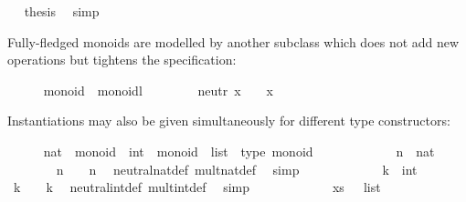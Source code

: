 \begin{isabellebody}
\ \isamarkupfalse%
\ {\isacharquery}thesis\ \isamarkupfalse%
\ simp\isanewline
\ \ \ \ \ \ \isamarkupfalse%
\isanewline
\ \ \ \ \isamarkupfalse%
%
\endisatagproof
{\isafoldproof}%
%
\isadelimproof
%
\endisadelimproof
%
\begin{isamarkuptext}%
\noindent Fully-fledged monoids are modelled by another subclass
  which does not add new operations but tightens the specification:%
\end{isamarkuptext}%
\isamarkuptrue%
\ \ \ \ \isamarkupfalse%
\ monoid\ {\isacharequal}\ monoidl\ {\isacharplus}\isanewline
\ \ \ \ \ \ \ neutr{\isacharcolon}\ {\isachardoublequoteopen}x\ \isactrlloc {\isasymotimes}\ \isactrlloc {\isasymone}\ {\isacharequal}\ x{\isachardoublequoteclose}%
\begin{isamarkuptext}%
\noindent Instantiations may also be given simultaneously for different
  type constructors:%
\end{isamarkuptext}%
\isamarkuptrue%
\ \ \ \ \isamarkupfalse%
\ nat\ {\isacharcolon}{\isacharcolon}\ monoid\ \ int\ {\isacharcolon}{\isacharcolon}\ monoid\ \ list\ {\isacharcolon}{\isacharcolon}\ {\isacharparenleft}type{\isacharparenright}\ monoid\isanewline
%
\isadelimproof
\ \ \ \ %
\endisadelimproof
%
\isatagproof
{}\isamarkupfalse%
\isanewline
\ \ \ \ \ \ \isamarkupfalse%
\ n\ {\isacharcolon}{\isacharcolon}\ nat\isanewline
\ \ \ \ \ \ \isamarkupfalse%
\ {\isachardoublequoteopen}n\ {\isasymotimes}\ {\isasymone}\ {\isacharequal}\ n{\isachardoublequoteclose}\ \isamarkupfalse%
\ neutral{\isacharunderscore}nat{\isacharunderscore}def\ mult{\isacharunderscore}nat{\isacharunderscore}def\ \isamarkupfalse%
\ simp\isanewline
\ \ \ \ \isamarkupfalse%
\isanewline
\ \ \ \ \ \ \isamarkupfalse%
\ k\ {\isacharcolon}{\isacharcolon}\ int\isanewline
\ \ \ \ \ \ \isamarkupfalse%
\ {\isachardoublequoteopen}k\ {\isasymotimes}\ {\isasymone}\ {\isacharequal}\ k{\isachardoublequoteclose}\ \isamarkupfalse%
\ neutral{\isacharunderscore}int{\isacharunderscore}def\ mult{\isacharunderscore}int{\isacharunderscore}def\ \isamarkupfalse%
\ simp\isanewline
\ \ \ \ \isamarkupfalse%
\isanewline
\ \ \ \ \ \ \isamarkupfalse%
\ xs\ {\isacharcolon}{\isacharcolon}\ {\isachardoublequoteopen}{\isasymalpha}\ list{\isachardoublequoteclose}\isanewline

\end{isabellebody}

